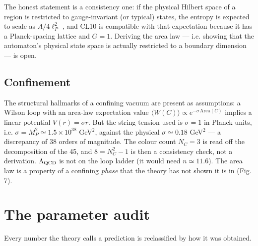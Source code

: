 \documentclass[aps,prd,amsmath,amssymb,superscriptaddress,longbibliography,floatfix,preprint]{revtex4-2}
\begin{document}
The honest statement is a consistency one: if the physical Hilbert space of a region is restricted to gauge-invariant (or typical) states, the entropy is expected to scale as $A/4\ell_P^2$ \cite{ref35,ref36}, and CL10 is compatible with that expectation because it has a Planck-spacing lattice and $G = 1$. Deriving the area law --- i.e. showing that the automaton's physical state space is actually restricted to a boundary dimension --- is open.

\subsection{Confinement}

The structural hallmarks of a confining vacuum are present as assumptions: a Wilson loop with an area-law expectation value $\langle W(C)\rangle \propto e^{-\sigma\,\allowbreak{}\mathrm{Area}(C)}$ \cite{ref28} implies a linear potential $V(r) = \sigma r$. But the string tension used is $\sigma = 1$ in Planck units, i.e. $\sigma = M_P^2 \simeq 1.5\times10^{38}$ GeV$^2$, against the physical $\sigma \simeq 0.18$ GeV$^2$ \cite{ref38} --- a discrepancy of 38 orders of magnitude. The colour count $N_C = 3$ is read off the decomposition of the 45, and $8 = N_C^2 - 1$ is then a consistency check, not a derivation. $\Lambda_{\rm QCD}$ is not on the loop ladder (it would need $n \simeq 11.6$). The area law is a property of a confining \emph{phase} that the theory has not shown it is in (Fig. 7).

\section{The parameter audit}

Every number the theory calls a prediction is reclassified by how it was obtained.
\end{document}
